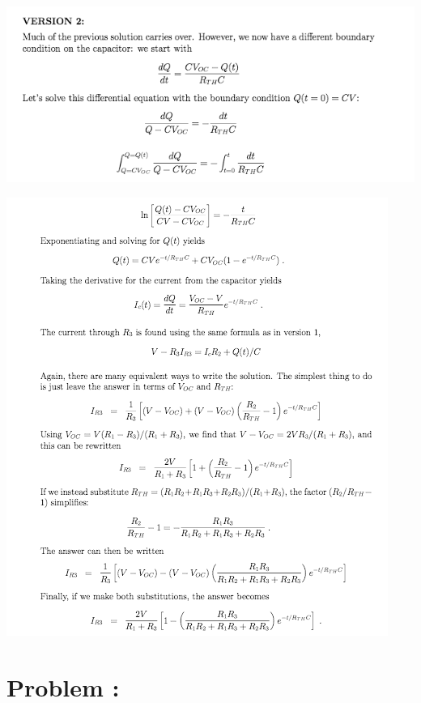 \documentclass[solutions]{esg8022pset}
\begin{document}
  \begin{center}\includegraphics[width=\textwidth]{ps07_sol_07_4}\end{center}
  \begin{center}\includegraphics[width=\textwidth]{ps07_sol_07_5}\end{center}
\section{Problem \thesection: }
\end{document}
